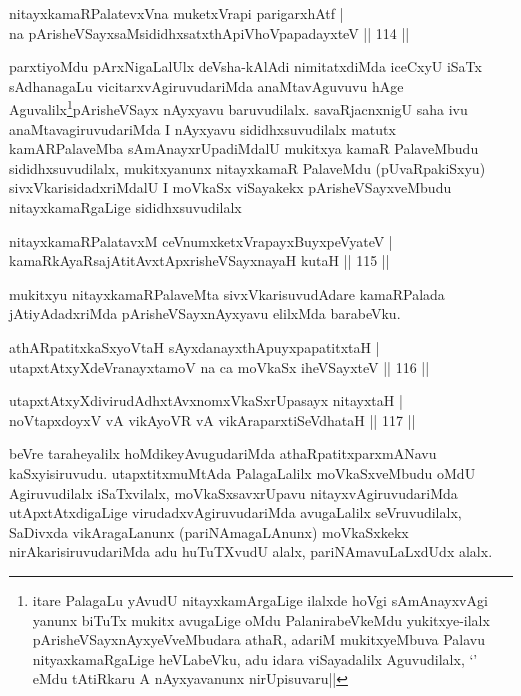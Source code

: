 \begin{shl}
nitayxkamaRPalatevxVna muketxVrapi parigarxhAtf |\\
na pArisheVSayxsaMsididhxsatxthA\s piVhoVpapadayxteV \hfill || 114 ||
\end{shl}

\begin{artha}
parxtiyoMdu pArxNigaLalUlx deVsha-kAlAdi nimitatxdiMda iceCxyU iSaTx sAdhanagaLu vicitarxvAgiruvudariMda anaMtavAguvuvu hAge Aguvalilx\footnote{itare PalagaLu yAvudU nitayxkamArgaLige ilalxde hoVgi sAmAnayxvAgi yanunx biTuTx mukitx avugaLige oMdu PalanirabeVkeMdu yukitxye-ilalx pArisheVSayxnAyxyeVveMbudara athaR, adariM mukitxyeMbuva Palavu nityaxkamaRgaLige heVLabeVku, adu idara viSayadalilx Aguvudilalx, `\stext' eMdu tAtiRkaru A nAyxyavanunx nirUpisuvaru||}pArisheVSayx nAyxyavu baruvudilalx. savaRjacnxnigU saha ivu anaMtavagiruvudariMda I nAyxyavu sididhxsuvudilalx matutx kamARPalaveMba sAmAnayxrUpadiMdalU mukitxya kamaR PalaveMbudu sididhxsuvudilalx, mukitxyanunx nitayxkamaR PalaveMdu (pUvaRpakiSxyu) sivxVkarisidadxriMdalU I moVkaSx viSayakekx pArisheVSayxveMbudu nitayxkamaRgaLige sididhxsuvudilalx
\end{artha}

\begin{shl}
nitayxkamaRPalatavxM ceVnumxketxVrapayxBuyxpeVyateV |\\
kamaRkAyaRsajAtitAvxtApxrisheVSayxnayaH kutaH \hfill || 115 ||
\end{shl}

\begin{artha}
mukitxyu nitayxkamaRPalaveMta sivxVkarisuvudAdare kamaRPalada jAtiyAdadxriMda pArisheVSayxnAyxyavu elilxMda barabeVku.
\end{artha}

\begin{shl}
athARpatitxkaSxyoV\s taH sAyxdanayxthA\s puyxpapatitxtaH |\\
utapxtAtxyXdeVranayxtamoV na ca moVkaSx iheVSayxteV \hfill || 116 ||
\end{shl}

\begin{shl}
utapxtAtxyXdivirudAdhxtAvxnomxVkaSxrUpasayx nitayxtaH |\\
noVtapxdoyxV vA vikAyoVR vA vikAraparxtiSeVdhataH \hfill || 117 ||
\end{shl}

\begin{artha}
beVre taraheyalilx hoMdikeyAvugudariMda athaRpatitxparxmANavu kaSxyisiruvudu. utapxtitxmuMtAda PalagaLalilx moVkaSxveMbudu oMdU Agiruvudilalx iSaTxvilalx, moVkaSxsavxrUpavu nitayxvAgiruvudariMda utApxtAtxdigaLige virudadxvAgiruvudariMda avugaLalilx seVruvudilalx, SaDivxda vikAragaLanunx (pariNAmagaLAnunx) moVkaSxkekx nirAkarisiruvudariMda adu huTuTXvudU alalx, pariNAmavuLaLxdUdx alalx.
\end{artha}

